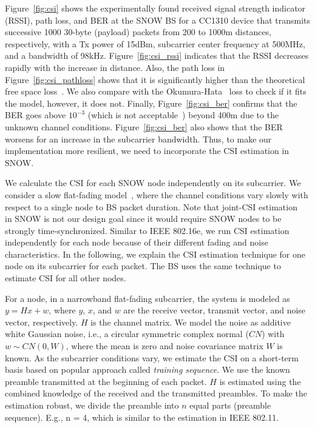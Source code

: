 Figure~\ref{fig:csi} shows the experimentally found received signal strength indicator (RSSI), path loss, and BER at the SNOW BS for a CC1310 device that transmits successive 1000 30-byte (payload) packets from 200 to 1000m distances, respectively, with a Tx power of 15dBm, subcarrier center frequency at 500MHz, and a bandwidth of 98kHz. Figure~\ref{fig:csi_rssi} indicates that the RSSI decreases rapidly with the increase in distance. Also, the path loss in Figure~\ref{fig:csi_pathloss} shows that it is significantly higher than the theoretical free space loss~\cite{rappaport1996wireless}. We also compare with the Okumura-Hata~\cite{rappaport1996wireless} loss to check if it fits the model, however, it does not. Finally, Figure~\ref{fig:csi_ber} confirms that the BER goes above $10^{-3}$ (which is not acceptable~\cite{rnr}) beyond 400m due to the unknown channel conditions. Figure~\ref{fig:csi_ber} also shows that the BER worsens for an increase in the subcarrier bandwidth. Thus, to make our implementation more resilient, we need to incorporate the CSI estimation in SNOW.

We calculate the CSI for each SNOW node independently on its subcarrier. We consider a slow flat-fading model~\cite{tse2005fundamentals}, where the channel conditions vary slowly with respect to a single node to BS packet duration. Note that joint-CSI estimation~\cite{jiang2007iterative, ribeiro2008uplink} in SNOW is not our design goal since it would require SNOW nodes to be strongly time-synchronized.  
Similar to IEEE 802.16e, we run CSI estimation independently for each node because of their different fading and noise characteristics. In the following, we explain the CSI estimation technique for one node on its subcarrier for each packet. The BS uses the same technique to estimate CSI for all other nodes. 

For a node, in a narrowband flat-fading subcarrier, the system is modeled as $y = Hx + w$,
where $y$, $x$, and $w$ are the receive vector, transmit vector, and noise vector, respectively. $H$ is the channel matrix. 
We model the noise as additive white Gaussian noise, i.e., a circular symmetric complex normal ($CN$) with $w \sim CN(0, W)$, where the mean is zero and noise covariance matrix $W$ is known.
As the subcarrier conditions vary, we estimate the CSI on a short-term basis based on popular approach called {\em training sequence}. We use the known preamble transmitted at the beginning of each packet. $H$ is estimated using the combined knowledge of the received and the transmitted preambles. To make the estimation robust, we divide the preamble into $n$ equal parts (preamble sequence). E.g., n = 4, which is similar to the estimation in IEEE 802.11.

